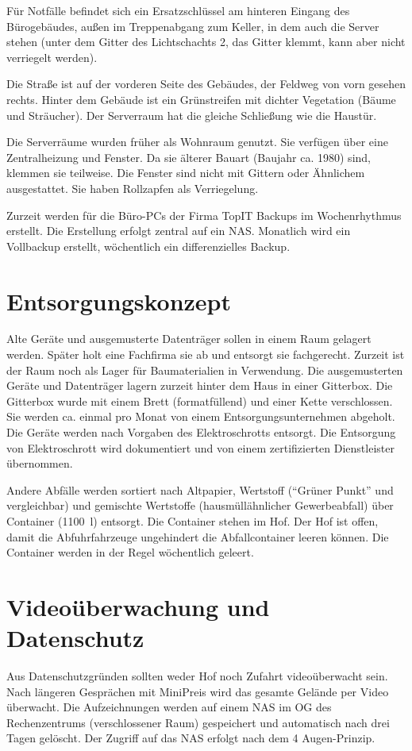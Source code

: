 \documentclass[a4paper,10pt]{scrreprt}
\begin{document}
Für Notfälle befindet sich ein Ersatzschlüssel am hinteren Eingang des Bürogebäudes, außen im Treppenabgang zum Keller, in dem auch die Server stehen (unter dem Gitter des Lichtschachts 2, das Gitter klemmt, kann aber nicht verriegelt werden).

Die Straße ist auf der vorderen Seite des Gebäudes, der Feldweg von vorn gesehen rechts. Hinter dem Gebäude ist ein Grünstreifen mit dichter Vegetation (Bäume und Sträucher). Der Serverraum hat die gleiche Schließung wie die Haustür.

Die Serverräume wurden früher als Wohnraum genutzt. Sie verfügen über eine Zentralheizung und Fenster. Da sie älterer Bauart (Baujahr ca. 1980) sind, klemmen sie teilweise. Die Fenster sind nicht mit Gittern oder Ähnlichem ausgestattet. Sie haben Rollzapfen als Verriegelung.

Zurzeit werden für die Büro-PCs der Firma TopIT Backups im Wochenrhythmus erstellt. Die Erstellung erfolgt zentral auf ein NAS. Monatlich wird ein Vollbackup erstellt, wöchentlich ein differenzielles Backup.

\section{Entsorgungskonzept}
Alte Geräte und ausgemusterte Datenträger sollen in einem Raum gelagert werden. Später holt eine Fachfirma sie ab und entsorgt sie fachgerecht. Zurzeit ist der Raum noch als Lager für Baumaterialien in Verwendung. Die ausgemusterten Geräte und Datenträger lagern zurzeit hinter dem Haus in einer Gitterbox. Die Gitterbox wurde mit einem Brett (formatfüllend) und einer Kette verschlossen. Sie werden ca. einmal pro Monat von einem Entsorgungsunternehmen abgeholt. Die Geräte werden nach Vorgaben des Elektroschrotts entsorgt. Die Entsorgung von Elektroschrott wird dokumentiert und von einem zertifizierten Dienstleister übernommen.

Andere Abfälle werden sortiert nach Altpapier, Wertstoff ("`Grüner Punkt"' und vergleichbar) und gemischte Wertstoffe (hausmüllähnlicher Gewerbeabfall) über Container (1100\, l) entsorgt. Die Container stehen im Hof. Der Hof ist offen, damit die Abfuhrfahrzeuge ungehindert die Abfallcontainer leeren können. Die Container werden in der Regel wöchentlich geleert.

\section{Videoüberwachung und Datenschutz}
Aus Datenschutzgründen sollten weder Hof noch Zufahrt videoüberwacht sein. Nach längeren Gesprächen mit MiniPreis wird das gesamte Gelände per Video überwacht. Die Aufzeichnungen werden auf einem NAS im OG des Rechenzentrums (verschlossener Raum) gespeichert und automatisch nach drei Tagen gelöscht. Der Zugriff auf das NAS erfolgt nach dem 4 Augen-Prinzip.
\end{document}
